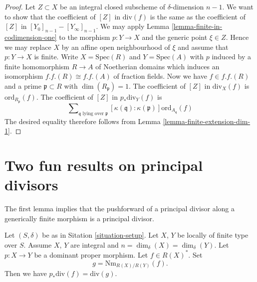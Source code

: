 \begin{proof}
\medskip\noindent
Let $Z \subset X$ be an integral closed subscheme of $\delta$-dimension
$n - 1$. We want to show that the coefficient of $[Z]$ in $\text{div}(f)$
is the same as the coefficient of $[Z]$ in
$[Y_0]_{n - 1} - [Y_\infty]_{n - 1}$.
We may apply Lemma \ref{lemma-finite-in-codimension-one}
to the morphism $p : Y \to X$ and
the generic point $\xi \in Z$. Hence we may replace $X$ by an
affine open neighbourhood of $\xi$ and assume that $p : Y \to X$ is finite.
Write $X = \text{Spec}(R)$ and $Y = \text{Spec}(A)$ with $p$ induced
by a finite homomorphism $R \to A$ of Noetherian domains which induces
an isomorphism $f.f.(R) \cong f.f.(A)$ of fraction fields.
Now we have $f \in f.f.(R)$ and a prime $\mathfrak p \subset R$
with $\dim(R_{\mathfrak p}) = 1$. The coefficient of
$[Z]$ in $\text{div}_X(f)$ is $\text{ord}_{R_\mathfrak p}(f)$.
The coefficient of $[Z]$ in $p_*\text{div}_Y(f)$ is
$$
\sum\nolimits_{\mathfrak q\text{ lying over }\mathfrak p}
[\kappa(\mathfrak q) : \kappa(\mathfrak p)]
\text{ord}_{A_{\mathfrak q}}(f)
$$
The desired equality therefore follows from
Lemma \ref{lemma-finite-extension-dim-1}.
\end{proof}




\section{Two fun results on principal divisors}
\label{section-two-fun}

\noindent
The first lemma implies that the pushforward of a principal
divisor along a generically finite morphism is a principal divisor.

\begin{lemma}
\label{lemma-proper-pushforward-alteration}
Let $(S, \delta)$ be as in Sitation \ref{situation-setup}.
Let $X$, $Y$ be locally of finite type over $S$. Assume $X$, $Y$
are integral and $n = \dim_\delta(X) = \dim_\delta(Y)$.
Let $p : X \to Y$ be a dominant proper morphism.
Let $f \in R(X)^*$. Set
$$
g = \text{Nm}_{R(X)/R(Y)}(f).
$$
Then we have
$p_*\text{div}(f) = \text{div}(g)$.
\end{lemma}

